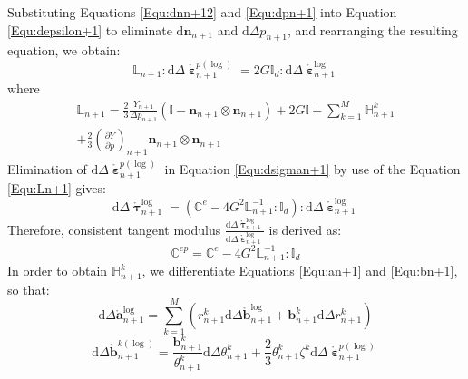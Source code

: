 Substituting Equations \ref{Equ:dnn+12} and \ref{Equ:dpn+1} into Equation \ref{Equ:depsilon+1} to eliminate ${\text{d}}{{\mathbf{n}}_{n + 1}}$ and ${\text{d}}\Delta {p_{n + 1}}$, and rearranging the resulting equation, we obtain:
\begin{equation}
{\mathbb{L}_{n + 1}}:{\text{d}}\Delta \mathring {\bm{\upepsilon}}_{n + 1}^{p(\log) } = 2G{\mathbb{I}_d}:{\text{d}}\Delta \mathring {\bm{\upepsilon}}_{n + 1}^{\log }
\end{equation}
where
\begin{equation}
\label{Equ:Ln+1}
\begin{aligned}
\mathbb{L}_{n + 1} = \frac{2}{3}\frac{Y_{n + 1}}{\Delta {p_{n + 1}}} \left( \mathbb{I} - \mathbf{n}_{n + 1} \otimes \mathbf{n}_{n + 1} \right) + 2G\mathbb{I} + \sum \limits_{k = 1}^M {\mathbb{H}_{n + 1}^k} \\
   + \frac{2}{3}{{\left( {\frac{{\partial Y}}{{\partial p}}} \right)}_{n + 1}}{{\mathbf{n}}_{n + 1}} \otimes {{\mathbf{n}}_{n + 1}}
\end{aligned}
\end{equation}
Elimination of ${\text{d}}\Delta \mathring {\bm{\upepsilon}}_{n + 1}^{p(\log) }$ in Equation \ref{Equ:dsigman+1} by use of the Equation \ref{Equ:Ln+1} gives:
\begin{equation}
{\text{d}}\Delta \mathring {\bm{\uptau}}_{n + 1}^{\log } = \left( {{\mathbb{C}^e} - 4{G^2}\mathbb{L}_{n + 1}^{ - 1}:{\mathbb{I}_d}} \right):{\text{d}}\Delta \mathring {\bm{\upepsilon}}_{n + 1}^{\log }
\end{equation}
Therefore, consistent tangent modulus $\frac{{\text{d}}\Delta \mathring {\bm{\uptau}}_{n + 1}^{\log }}{{\text{d}}\Delta \mathring {\bm{\upepsilon}}_{n + 1}^{\log }}$ is derived as:
\begin{equation}
{\mathbb{C}^{ep}} = {\mathbb{C}^e} - 4{G^2}\mathbb{L}_{n + 1}^{ - 1}:{\mathbb{I}_d}
\end{equation}
In order to obtain $\mathbb{H}_{n + 1}^k$, we differentiate Equations \ref{Equ:an+1} and \ref{Equ:bn+1}, so that:
\begin{equation}
\text{d} \Delta \mathring {\mathbf{a}}_{n + 1}^{\log } = \sum\limits_{k = 1}^M {\left( {r_{n + 1}^k\text{d} \Delta \mathring {\mathbf{b}}_{n + 1}^{\log } + {\mathbf{b}}_{n + 1}^k{\text{d}} \Delta r_{n + 1}^k} \right)}
\end{equation}
\begin{equation}
\label{Equ:dbn+1}
\text{d} \Delta \mathring {\mathbf{b}}_{n + 1}^{k(\log) } = \frac{{{\mathbf{b}}_{n + 1}^k}}{{\theta _{n + 1}^k}}{\text{d}} \Delta \theta _{n + 1}^k + \frac{2}{3}\theta _{n + 1}^k{\zeta ^k}{\text{d}}\Delta \mathring {\bm{\upepsilon}}_{n + 1}^{p(\log) }
\end{equation}
